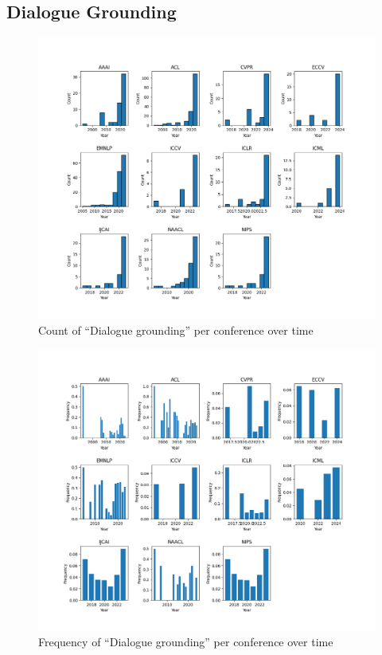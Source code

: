 \documentclass[11pt]{article}
\begin{document}
\subsection{Dialogue Grounding}
\label{sec:appendix_word_sense_years_dialogue}
\begin{figure}[H]
  \includegraphics[width=0.75\columnwidth]{figs/grounding_figs/Dialogue/split_by_conf_grounding_dist.png}
  \centering
  \caption{Count of ``Dialogue grounding'' per conference over time}
  \label{fig:appendix_dialogue_all_confs_count}
\end{figure}

\begin{figure}[H]
  \includegraphics[width=0.75\columnwidth]{figs/freq_grounding_figs/Dialogue/split_by_conf_grounding_dist.png}
  \centering
  \caption{Frequency of ``Dialogue grounding'' per conference over time}
  \label{fig:appendix_dialogue_all_confs_freq}
\end{figure}
\end{document}
